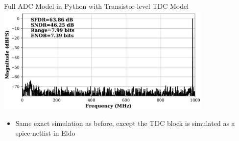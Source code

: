 \documentclass{sdkslides}
\begin{document}
\subsection*{\sectionname} 
\begin{frame}[c]
    \frametitle{\sectionname}
    \begin{center}
        Full ADC Model in Python with Transistor-level TDC Model
        \includegraphics[width=0.8\textwidth]{Pics/latido_fft_eldo}
    \end{center}
    \begin{itemize}
        \item Same exact simulation as before, except the TDC block is
            simulated as a spice-netlist in Eldo
    \end{itemize}
\end{frame}


\renewcommand{\sectionname}{Example 4: Multi-user MIMO receiver}
\end{document}
